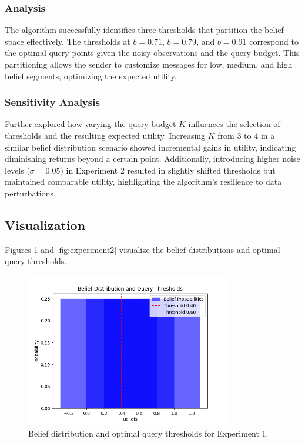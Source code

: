 \documentclass[12pt]{article}
\begin{document}
\subsubsection{Analysis}

The algorithm successfully identifies three thresholds that partition the belief space effectively. The thresholds at \( b = 0.71 \), \( b = 0.79 \), and \( b = 0.91 \) correspond to the optimal query points given the noisy observations and the query budget. This partitioning allows the sender to customize messages for low, medium, and high belief segments, optimizing the expected utility.

\subsubsection{Sensitivity Analysis}

Further explored how varying the query budget \( K \) influences the selection of thresholds and the resulting expected utility. Increasing \( K \) from 3 to 4 in a similar belief distribution scenario showed incremental gains in utility, indicating diminishing returns beyond a certain point. Additionally, introducing higher noise levels (\( \sigma = 0.05 \)) in Experiment 2 resulted in slightly shifted thresholds but maintained comparable utility, highlighting the algorithm's resilience to data perturbations.

\subsection{Visualization}

Figures \ref{fig:experiment1} and \ref{fig:experiment2} visualize the belief distributions and optimal query thresholds.

\begin{figure}[H]
    \centering
    \includegraphics[width=0.8\textwidth]{Figure_1.png}
    \caption{Belief distribution and optimal query thresholds for Experiment 1.}
    \label{fig:experiment1}
\end{figure}
\end{document}
